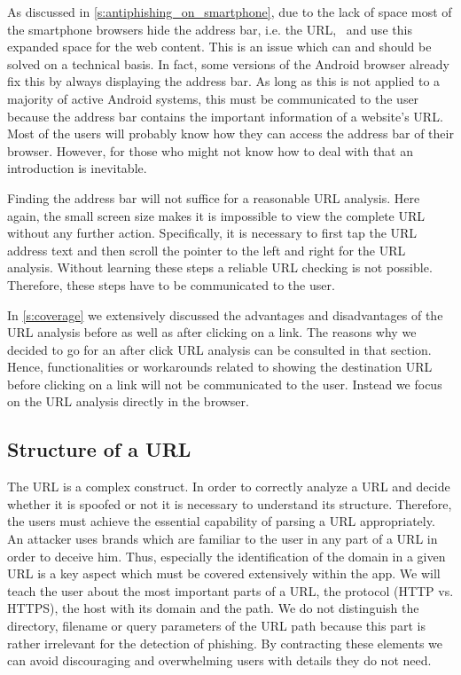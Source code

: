 \begin{description}[leftmargin=0cm]
	\item[Invisible Address Bar:] As discussed in \autoref{s:antiphishing_on_smartphone}, due to the lack of space most of the smartphone browsers hide the address bar, i.e. the URL,~\cite{amrutkar2012measuring} and use this expanded space for the web content. This is an issue which can and should be solved on a technical basis. In fact, some versions of the Android browser already fix this by always displaying the address bar. As long as this is not applied to a majority of active Android systems, this must be communicated to the user because the address bar contains the important information of a website's URL.
Most of the users will probably know how they can access the address bar of their browser.
However, for those who might not know how to deal with that an introduction is inevitable.

	\item[Analyze Complete URL Via Address Bar:] Finding the address bar will not suffice for a reasonable URL analysis. 
Here again, the small screen size makes it is impossible to view the complete URL without any further action.
Specifically, it is necessary to first tap the URL address text and then scroll the pointer to the left and right for the URL analysis.
Without learning these steps a reliable URL checking is not possible. 
Therefore, these steps have to be communicated to the user.

	\item[Analyze URL After Click:] In \autoref{s:coverage} we extensively discussed the advantages and disadvantages of the URL analysis before as well as after clicking on a link.
The reasons why we decided to go for an after click URL analysis can be consulted in that section.
Hence, functionalities or workarounds related to showing the destination URL before clicking on a link will not be communicated to the user.
Instead we focus on the URL analysis directly in the browser.
\end{description}

\subsection{Structure of a URL}
\label{s:url_structure}
The URL is a complex construct. 
In order to correctly analyze a URL and decide whether it is spoofed or not it is necessary to understand its structure. 
Therefore, the users must achieve the essential capability of parsing a URL appropriately.
An attacker uses brands which are familiar to the user in any part of a URL in order to deceive him. 
Thus, especially the identification of the domain in a given URL is a key aspect which must be covered extensively within the app. 
We will teach the user about the most important parts of a URL, the protocol (HTTP vs. HTTPS), the host with its domain and the path.
We do not distinguish the directory, filename or query parameters of the URL path because this part is rather irrelevant for the detection of phishing.
By contracting these elements we can avoid discouraging and overwhelming users with details they do not need.

